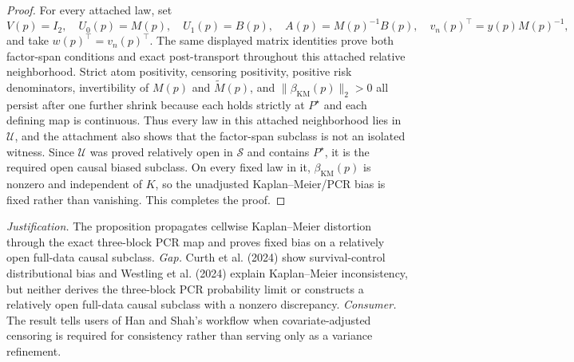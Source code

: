 \documentclass{article}
\begin{document}
\begin{proof}
For every attached law, set
\[
V(p)=I_2,\quad U_0(p)=M(p),\quad U_1(p)=B(p),\quad
A(p)=M(p)^{-1}B(p),\quad v_n(p)^\top=y(p)M(p)^{-1},
\]
and take \(w(p)^\top=v_n(p)^\top\). The same displayed matrix identities prove both factor-span conditions and exact post-transport throughout this attached relative neighborhood. Strict atom positivity, censoring positivity, positive risk denominators, invertibility of \(M(p)\) and \(\widetilde M(p)\), and \(\|\beta_{\mathrm{KM}}(p)\|_2>0\) all persist after one further shrink because each holds strictly at \(P^\star\) and each defining map is continuous. Thus every law in this attached neighborhood lies in \(\mathcal U\), and the attachment also shows that the factor-span subclass is not an isolated witness. Since \(\mathcal U\) was proved relatively open in \(\mathcal S\) and contains \(P^\star\), it is the required open causal biased subclass. On every fixed law in it, \(\beta_{\mathrm{KM}}(p)\) is nonzero and independent of \(K\), so the unadjusted Kaplan--Meier/PCR bias is fixed rather than vanishing. This completes the proof.
\end{proof}
\par\smallskip\noindent \textit{Justification.} The proposition propagates cellwise Kaplan--Meier distortion through the exact three-block PCR map and proves fixed bias on a relatively open full-data causal subclass. \textit{Gap.} Curth et al. (2024) show survival-control distributional bias and Westling et al. (2024) explain Kaplan--Meier inconsistency, but neither derives the three-block PCR probability limit or constructs a relatively open full-data causal subclass with a nonzero discrepancy. \textit{Consumer.} The result tells users of Han and Shah's workflow when covariate-adjusted censoring is required for consistency rather than serving only as a variance refinement.
\end{document}
